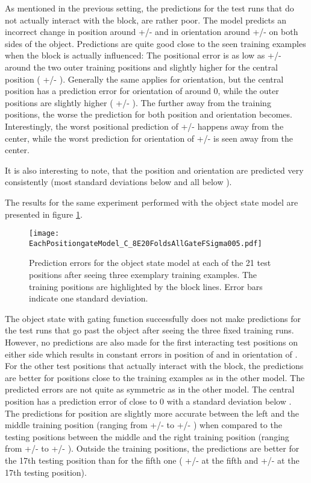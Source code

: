 As mentioned in the previous setting, the predictions for the test runs that do not actually interact with the block, are rather poor. The model predicts an incorrect change in position around  +/-  and in orientation around  +/-  on both sides of the object. 
Predictions are quite good close to the seen training examples when the block is actually influenced: The positional error is as low as  +/-  around the two outer training positions and slightly higher for the central position ( +/- ). Generally the same applies for orientation, but the central position has a prediction error for orientation of around 0, while the outer positions are slightly higher ( +/- ).
The further away from the training positions, the worse the prediction for both position and orientation becomes. Interestingly, the worst positional prediction of  +/-   happens  away from the center, while the worst prediction for orientation of  +/-  is seen  away from the center.

It is also interesting to note, that the position and orientation are predicted very consistently (most standard deviations below  and all below ).

The results for the same experiment performed with the object state model are presented in figure \ref{fig:eachPosGate}.

\begin{figure}
\centering
\texttt{[image: EachPositiongateModel\_C\_8E20FoldsAllGateFSigma005.pdf]}
\caption{Prediction errors for the object state model at each of the 21 test positions after seeing three exemplary training examples. The training positions are highlighted by the block lines. Error bars indicate one standard deviation.}
\label{fig:eachPosGate}
\end{figure}

The object state with gating function successfully does not make predictions for the test runs that go past the object after seeing the three fixed training runs. However, no predictions are also made for the first interacting test positions on either side which results in constant errors in position of  and in orientation of .
For the other test positions that actually interact with the block, the predictions are better for positions close to the training examples as in the other model.
The predicted errors are not quite as symmetric as in the other model.
The central position has a prediction error of close to 0 with a standard deviation below . 
The predictions for position are slightly more accurate between the left and the middle training position (ranging from  +/-  to  +/- ) when compared to the testing positions between the middle and the right training position (ranging from  +/-  to  +/- ). Outside the training positions, the predictions are better for the 17th testing position than for the fifth one ( +/-  at the fifth and  +/-  at the 17th testing position).

